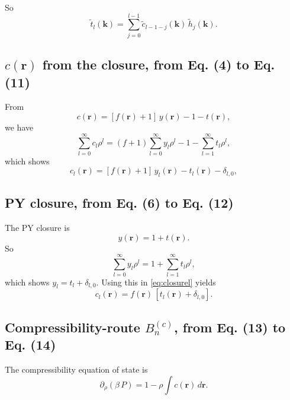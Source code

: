 \documentclass[preprint]{revtex4-1}
\numberwithin{equation}{subsection}
\numberwithin{table}{section}
\newcommand{\vct}[1]{\mathbf{#1}}
\providecommand{\vr}{} %
\renewcommand{\vr}{\vct{r}}
\newcommand{\vk}{\vct{k}}
\begin{document}
So
\begin{equation}
  \tilde{t}_l(\vk)
= \sum_{j = 0}^{l - 1}
  \tilde{c}_{l-1-j}(\vk) \, \tilde{h}_j(\vk).
  \tag{10}
\end{equation}



\subsection{$c(\vr)$ from the closure, from Eq. (4) to Eq. (11)}

From
\begin{equation}
  c(\vr) = [f(\vr) + 1] \, y(\vr) - 1 - t(\vr),
  \tag{4}
  \label{eq:closure}
\end{equation}
we have
\[
  \sum_{l = 0}^{\infty} c_l \rho^l
= (f + 1) \sum_{l = 0}^{\infty} y_l \rho^l
  - 1 - \sum_{l = 1}^{\infty} t_l \rho^l,
\]
which shows
\begin{equation}
  c_l(\vr) = [f(\vr) + 1] \, y_l(\vr) - t_l(\vr) - \delta_{l, 0},
  \tag{11}
  \label{eq:closurel}
\end{equation}



\subsection{PY closure, from Eq. (6) to Eq. (12)}



The PY closure is
\begin{equation}
  y(\vr) = 1 + t(\vr).
  \tag{6}
  \label{eq:pyclosure}
\end{equation}
So
\[
  \sum_{l = 0}^{\infty} y_l \rho^l = 1 + \sum_{l = 1}^{\infty} t_l \rho^l,
\]
which shows $y_l = t_l + \delta_{l, 0}$.
%
Using this in \eqref{eq:closurel} yields
\begin{equation}
  c_l(\vr) = f(\vr) \, [t_l(\vr) + \delta_{l, 0}].
  \tag{12}
\end{equation}



\subsection{Compressibility-route $B_n^{(c)}$, from Eq. (13) to Eq. (14)}



The compressibility equation of state is
\begin{equation}
  \partial_\rho (\beta \, P) = 1 - \rho \int c(\vr) \, d\vr.
  \tag{13}
  \label{eq:compr}
\end{equation}
\end{document}
